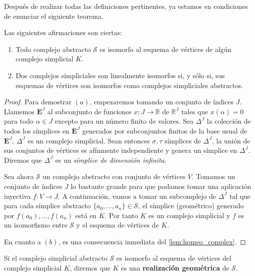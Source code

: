 Después de realizar todas las definiciones pertinentes, ya estamos en condiciones de enunciar el 
siguiente teorema.

\begin{teorema}
	Las siguientes afirmaciones son ciertas:
	\begin{enumerate}[label=(\alph*)]
		\item Todo complejo abstracto $\mathcal{S}$ es isomorfo al esquema de vértices de algún 
		complejo simplicial $K$.
		\item Dos complejos simpliciales son linealmente isomorfos si, y sólo si, sus esquemas 
		de vértices son isomorfos como complejos simpliciales abstractos.
	\end{enumerate}
\end{teorema}
\begin{proof}
	Para demostrar $(a)$, empezaremos tomando un conjunto de índices $J$. Llamemos $\mathbf{E}^J$ 
	al subconjunto de funciones $x: J \rightarrow \mathbb{R}$ de $\mathbb{R}^J$ tales que $x(\alpha) = 0$ 
	para todo $\alpha \in J$ excepto para un número finito de valores. Sea $\Delta^J$ la 
	colección de todos los símplices en $\mathbf{E}^J$ generados por subconjuntos finitos de 
	la base usual de $\mathbf{E}^J$. $\Delta^J$ es un complejo simplicial. 
	Sean entonces $\sigma, \tau$ símplices de $\Delta^J$, la 
	unión de sus conjuntos de vértices es afínmente independiente y genera un símplice en $\Delta^J$.
	Diremos que $\Delta^J$ es un \textit{símplice de dimensión infinita}.
	
	Sea ahora $\mathcal{S}$ un complejo abstracto con conjunto de vértices $V$. Tomamos un conjunto 
	de índices $J$ lo bastante grande para que podamos tomar una aplicación inyectiva 
	$f: V \rightarrow J$. A continuación, vamos a tomar un subcomplejo de $\Delta^J$ tal que para 
	cada símplice abstracto $\{a_0, \dots, a_n\} \in \mathcal{S}$, el símplice (geométrico) generado 
	por $f(a_0), \dots, f(a_n)$ está en $K$. Por tanto $K$ es un complejo simplicial y 
	$f$ es un isomorfismo entre $\mathcal{S}$ y el esquema de vértices de $K$.
	
	En cuanto a $(b)$, es una consecuencia inmediata del \autoref{lem:homeo_complex}.
\end{proof}

\begin{definicion}
	Si el complejo simplicial abstracto $\mathcal{S}$ es isomorfo al esquema de vértices del 
	complejo simplicial $K$, diremos que $K$ es una \textbf{realización geométrica} de $\mathcal{S}$.
\end{definicion}


\endinput
